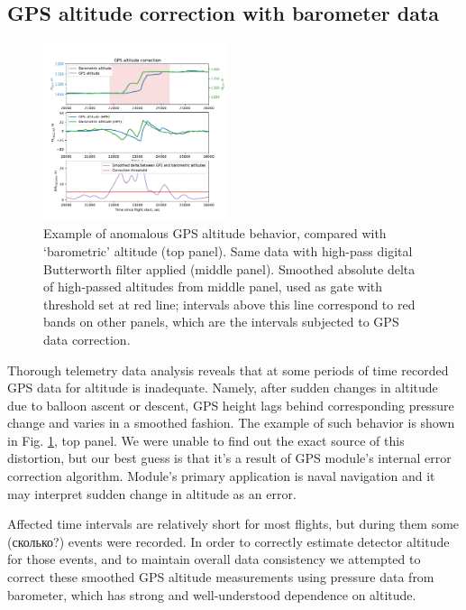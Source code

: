\documentclass[final,5p,times,twocolumn]{elsarticle}
\begin{document}
\subsection{GPS altitude correction with barometer data}
\label{sect:gps_correction}

\begin{figure}[tb]
    \includegraphics[width=0.48\textwidth]{figs/height_correction.pdf} 
    \caption{Example of anomalous GPS altitude behavior, compared with `barometric' altitude (top panel). Same data with high-pass digital Butterworth filter applied (middle panel). Smoothed absolute delta of high-passed altitudes from middle panel, used as gate with threshold set at red line; intervals above this line correspond to red bands on other panels, which are the intervals subjected to GPS data correction.}
\label{fig:h_corr}
\end{figure}

Thorough telemetry data analysis reveals that at some periods of time recorded GPS data for altitude is inadequate. Namely, after sudden changes in altitude due to balloon ascent or descent, GPS height lags behind corresponding pressure change and varies in a smoothed fashion. The example of such behavior is shown in Fig. \ref{fig:h_corr}, top panel. We were unable to find out the exact source of this distortion, but our best guess is that it's a result of GPS module's internal error correction algorithm. Module's primary application is naval navigation \cite{GPS-module-specs} and it may interpret sudden change in altitude as an error.

Affected time intervals are relatively short for most flights, but during them some (сколько?) events were recorded. In order to correctly estimate detector altitude for those events, and to maintain overall data consistency we attempted to correct these smoothed GPS altitude measurements using pressure data from barometer, which has strong and well-understood dependence on altitude.
\end{document}

